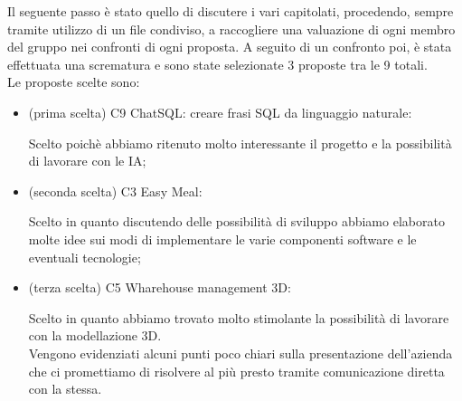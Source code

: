 \documentclass[12pt,a4paper]{article}
\begin{document}
Il seguente passo è stato quello di discutere i vari capitolati, procedendo, sempre tramite utilizzo di un
file
condiviso, a raccogliere una valuazione di ogni membro del gruppo nei confronti
di ogni proposta. A seguito di un confronto poi, è stata effettuata una scrematura e sono state selezionate 3 proposte tra le 9 totali.\\
Le proposte scelte sono:
\begin{itemize}
    \item (prima scelta) C9 ChatSQL: creare frasi SQL da linguaggio naturale:
    
          Scelto poichè abbiamo ritenuto molto interessante il progetto e la
          possibilità di lavorare con le IA; 

    \item (seconda scelta) C3 Easy Meal:
            
          Scelto in quanto discutendo delle possibilità
          di
          sviluppo abbiamo elaborato molte idee sui modi di implementare le
          varie
          componenti software e le eventuali tecnologie;
    \item (terza scelta) C5 Wharehouse management 3D:
    
          Scelto in quanto abbiamo trovato
          molto
          stimolante la possibilità di lavorare con la modellazione 3D. \\
          Vengono evidenziati alcuni
          punti poco
          chiari sulla presentazione dell'azienda che ci promettiamo di risolvere al più presto tramite comunicazione diretta con la stessa.
\end{itemize}
\end{document}
